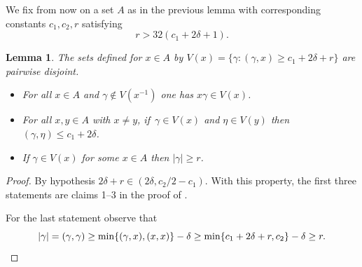 \documentclass[10pt]{amsart}
\newtheorem{lemma}[theorem]{Lemma}
\begin{document}
We fix from now on a set \(A\) as in the previous lemma with corresponding constants \(c_1,c_2,r\) satisfying
\begin{equation}\label{requation}
r > 32(c_1+2\delta+1).
\end{equation}

\begin{lemma}\label{borrowedlemma}
The sets defined for \(x \in A\) by \(V(x) = \lbrace \gamma: (\gamma,x) \ge c_1+2\delta + r\rbrace\) are pairwise disjoint.

\begin{itemize}
\item
For all \(x \in A\) and \(\gamma \notin V(x^{-1})\) one has \(x\gamma \in V(x)\).

\item
For all \(x,y \in A\) with \(x \neq y\), if~\(\gamma \in V(x)\) and \(\eta \in V(y)\) then \((\gamma,\eta) \le c_1+2\delta\).

\item
If \(\gamma \in V(x)\) for some \(x \in A\) then \(|\gamma| \ge r\).
\end{itemize}
\end{lemma}
\begin{proof}
By hypothesis \(2\delta + r \in (2\delta,c_2/2 - c_1)\). With this property, the first three statements are claims 1--3 in the proof of \cite[Lem.\,4.1]{random}.

For the last statement observe that
\[
|\gamma| = (\gamma,\gamma) \ge \min\lbrace (\gamma,x),(x,x)\rbrace - \delta \ge \min \lbrace c_1 + 2\delta + r, c_2\rbrace - \delta \ge r.\qedhere
\]
\end{proof}
\end{document}
